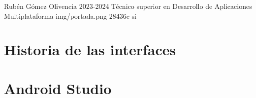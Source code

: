 \documentclass{\ClassPath/yukibook}
\begin{document}
    {Rubén Gómez Olivencia}  %
    {2023-2024}    %
    {Técnico superior en \linebreak Desarrollo de  Aplicaciones Multiplataforma} %
    {}%
    {}%
    {img/portada.png} %
    {28436c}
    {si} %


    \coverpage
    \graphicspath{{../../../yukibook.cls/}}
    \licensepage

    \tableofcontents


    \part{Historia de las interfaces}
    \graphicspath{{./img/di/tema_1}}
    


    \part{Android Studio}
    \graphicspath{{./img/di/tema_2}}
    
\end{document}
